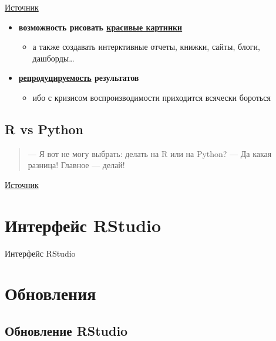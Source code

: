 \documentclass[
  letterpaper,
  DIV=11,
  numbers=noendperiod]{scrreprt}
\providecommand{\tightlist}{%
  \setlength{\itemsep}{0pt}\setlength{\parskip}{0pt}}\usepackage{longtable,booktabs,array}
\theoremstyle{definition}
\theoremstyle{remark}
\begin{document}
\href{https://1d4chan.org/wiki/Linear_Warriors,_Quadratic_Wizards}{Источник}

\begin{itemize}
\tightlist
\item
  \textbf{возможность рисовать
  \href{https://r-graph-gallery.com/index.html}{красивые картинки}}

  \begin{itemize}
  \tightlist
  \item
    а также создавать интерктивные отчеты, книжки, сайты, блоги,
    дашборды\ldots{}
  \end{itemize}
\item
  \textbf{\href{https://en.wikipedia.org/wiki/Reproducibility_Project}{репродуцируемость}
  результатов}

  \begin{itemize}
  \tightlist
  \item
    ибо с кризисом воспроизводимости приходится всячески бороться
  \end{itemize}
\end{itemize}

\subsection{R vs Python}\label{rbasics-r-vs-py}

\begin{quote}
--- Я вот не могу выбрать: делать на R или на Python? --- Да какая
разница! Главное --- делай!
\end{quote}

\href{https://andreyex.ru/programmirovanie/r-vs-python-samaya-aktualnaya-diskussiya-dlya-nachinayushhih-uchenyh-dannyh/}{Источник}

\section{Интерфейс RStudio}\label{rbasics-rstudio-interface}

Интерфейс RStudio

\section{Обновления}\label{rbasics-updates}

\subsection{Обновление RStudio}\label{rbasics-updates-rstudio}
\end{document}
